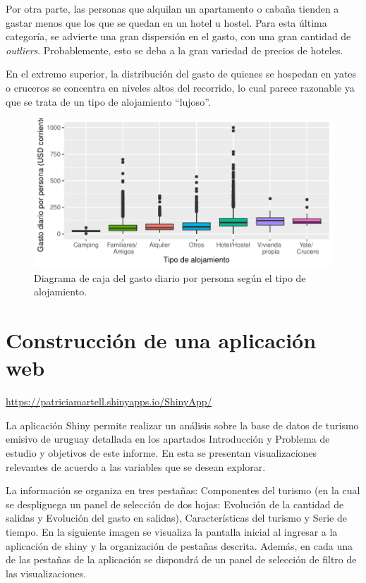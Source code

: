\documentclass[
]{article}
\begin{document}
Por otra parte, las personas que alquilan un apartamento o cabaña
tienden a gastar menos que los que se quedan en un hotel u hostel. Para
esta última categoría, se advierte una gran dispersión en el gasto, con
una gran cantidad de \emph{outliers}. Probablemente, esto se deba a la
gran variedad de precios de hoteles.

En el extremo superior, la distribución del gasto de quienes se hospedan
en yates o cruceros se concentra en niveles altos del recorrido, lo cual
parece razonable ya que se trata de un tipo de alojamiento ``lujoso''.

\begin{figure}[H]

{\centering \includegraphics{Informe-Proyectofinal_files/figure-latex/boxplot5-1} 

}

\caption{Diagrama de caja del gasto diario por persona según el tipo de alojamiento.}\label{fig:boxplot5}
\end{figure}

\hypertarget{construcciuxf3n-de-una-aplicaciuxf3n-web}{%
\section{\texorpdfstring{Construcción de una aplicación web
\label{shiny}}{Construcción de una aplicación web }}\label{construcciuxf3n-de-una-aplicaciuxf3n-web}}

\url{https://patriciamartell.shinyapps.io/ShinyApp/}

La aplicación Shiny permite realizar un análisis sobre la base de datos
de turismo emisivo de uruguay detallada en los apartados Introducción y
Problema de estudio y objetivos de este informe. En esta se presentan
visualizaciones relevantes de acuerdo a las variables que se desean
explorar.

La información se organiza en tres pestañas: Componentes del turismo (en
la cual se despliguega un panel de selección de dos hojas: Evolución de
la cantidad de salidas y Evolución del gasto en salidas),
Características del turismo y Serie de tiempo. En la siguiente imagen se
visualiza la pantalla inicial al ingresar a la aplicación de shiny y la
organización de pestañas descrita. Además, en cada una de las pestañas
de la aplicación se dispondrá de un panel de selección de filtro de las
visualizaciones.
\end{document}
